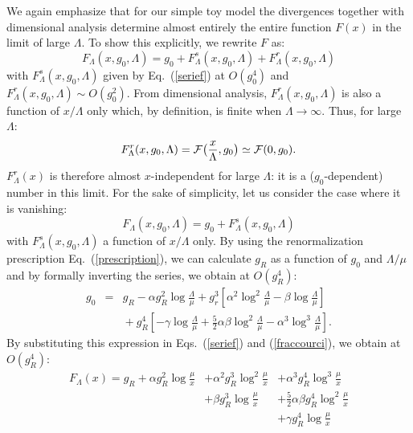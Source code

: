 \documentclass[floatfix,preprintnumbers,amsmath,amssymb,prb,12pt]{revtex4-1}
\begin{document}
We again emphasize that for our simple toy model the divergences
together with dimensional analysis determine almost entirely the
entire function $F(x)$ in the limit of large
$\Lambda$. To show this explicitly, we rewrite
$F$ as:
\begin{equation}
F_\Lambda(x,g_0,\Lambda)= g_0 + F_\Lambda^s(x,g_0,\Lambda)+ F_\Lambda^r(x,g_0,\Lambda)
\label{decomposition}
\end{equation}
with $F_\Lambda^s(x,g_0,\Lambda)$ given by Eq.~(\ref{serief}) at
$O(g_0^4)$ and $F_\Lambda^r(x,g_0,\Lambda)\sim O(g_0^2)$. From
dimensional analysis, $F_\Lambda^r(x,g_0,\Lambda)$ is also a
function of $x/\Lambda$ only which, by definition, is finite when
$\Lambda\to\infty$. Thus, for large $\Lambda$:
\begin{equation}
F_\Lambda^r(x,g_0,\Lambda)= {\cal
F}\big(\frac{x}{\Lambda},g_0\big)\simeq {\cal F}(0,g_0).
\end{equation}
$F_\Lambda^r(x)$ is therefore almost $x$-independent for large
$\Lambda$: it is a ($g_0$-dependent) number in this limit. For the
sake of simplicity, let us consider the case where it is vanishing:
\begin{equation}
F_\Lambda(x,g_0,\Lambda)= g_0 + F_\Lambda^s(x,g_0,\Lambda)
\label{fraccourci}
\end{equation}
with $F_\Lambda^s(x,g_0,\Lambda)$ a function of $x/\Lambda$ only.
By using the renormalization prescription
Eq.~(\ref{prescription}), we can calculate $g_R$ as a function of
$g_0$ and $\Lambda/\mu$ and by formally inverting the series, we
obtain at $O(g_R^4)$:
\begin{eqnarray}
g_0&=& g_R -\alpha g_R^2 \log \frac{\Lambda}{\mu}
+g_r^3 [\alpha^2 \log^2 \frac{\Lambda}{\mu} - 
\beta \log \frac{\Lambda}{\mu}] \nonumber \\
&&{} + g_R^4[-\gamma \log \frac{\Lambda}{\mu} +\frac{5}{2}
\alpha\beta \log^2 \frac{\Lambda}{\mu} -\alpha^3 \log^3
\frac{\Lambda}{\mu}].
\end{eqnarray}
By substituting this expression in Eqs.~(\ref{serief}) and
(\ref{fraccourci}), we obtain at $O(g_R^4)$:
\begin{equation}
\begin{array}{lll}
F_{\Lambda}(x)=g_R+{\displaystyle\alpha g_R^2\log\frac{\mu}{x}} 
       &{\displaystyle+ \alpha^2 g_R^3 \log^2\frac{\mu}{x}} &{\displaystyle+\alpha^3g_R^4 \log^3\frac{\mu}{x}} \\
       &{\displaystyle+  \beta g_R^3 \log\frac{\mu}{x}}     &{\displaystyle+\frac{5}{2}\alpha\beta g_R^4\log^2\frac{\mu}{x}}\\
       &                                                        &{\displaystyle+\gamma g_R^4\log\frac{\mu}{x}}
\end{array}
\label{Ftot_ren}
\end{equation}
\end{document}
